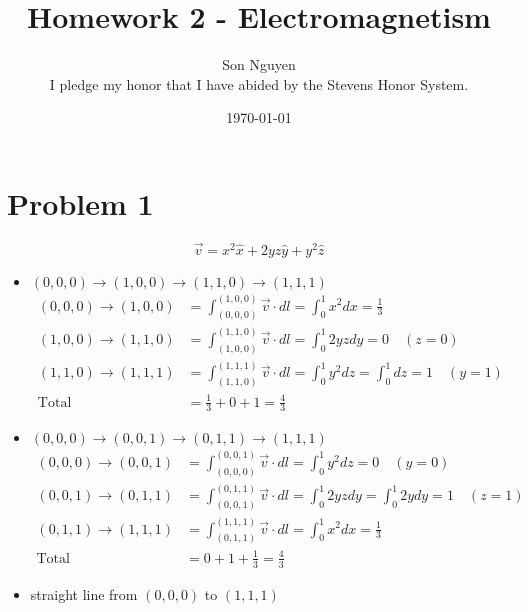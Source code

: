 \documentclass[12pt]{article}
\title{Homework 2 - Electromagnetism}
\author{Son Nguyen \\
I pledge my honor that I have abided by the Stevens Honor System.}
\date{\today}
\begin{document}
\maketitle
\section*{Problem 1}
\[\vec{v} = x^2 \hat{x} + 2yz \hat{y} +y^2 \hat{z}\]
\begin{itemize}
	\item \((0,0,0) \rightarrow (1,0,0) \rightarrow (1,1,0) \rightarrow (1,1,1)\)
	      \begin{align*}
		      (0,0,0) \rightarrow (1,0,0) & = \int_{(0,0,0)}^{(1,0,0)} \vec{v} \cdot dl = \int_{0}^{1} x^2 dx = \frac{1}{3}                   \\
		      (1,0,0) \rightarrow (1,1,0) & = \int_{(1,0,0)}^{(1,1,0)} \vec{v} \cdot dl = \int_{0}^{1} 2yz dy = 0 \quad (z = 0)               \\
		      (1,1,0) \rightarrow (1,1,1) & = \int_{(1,1,0)}^{(1,1,1)} \vec{v} \cdot dl = \int_{0}^{1} y^2 dz = \int_{0}^{1}dz = 1 \quad(y=1) \\
		      \text{Total}                & = \frac{1}{3} + 0 + 1 = \frac{4}{3}
	      \end{align*}
	\item \((0,0,0) \rightarrow (0,0,1) \rightarrow (0,1,1) \rightarrow (1,1,1)\)
	\begin{align*}
        (0,0,0) \rightarrow (0,0,1) & = \int_{(0,0,0)}^{(0,0,1)} \vec{v} \cdot dl = \int_{0}^{1} y^2 dz = 0 \quad (y = 0) \\
        (0,0,1) \rightarrow (0,1,1) & = \int_{(0,0,1)}^{(0,1,1)} \vec{v} \cdot dl = \int_{0}^{1} 2yz dy = \int_{0}^{1} 2ydy = 1 \quad (z = 1) \\
        (0,1,1) \rightarrow (1,1,1) & = \int_{(0,1,1)}^{(1,1,1)} \vec{v} \cdot dl = \int_{0}^{1} x^2 dx = \frac{1}{3}  \\
        \text{Total}                & = 0 + 1 + \frac{1}{3} = \frac{4}{3}
    \end{align*}
    \item straight line from \((0,0,0)\) to \((1,1,1)\)
\end{itemize}
\end{document}

